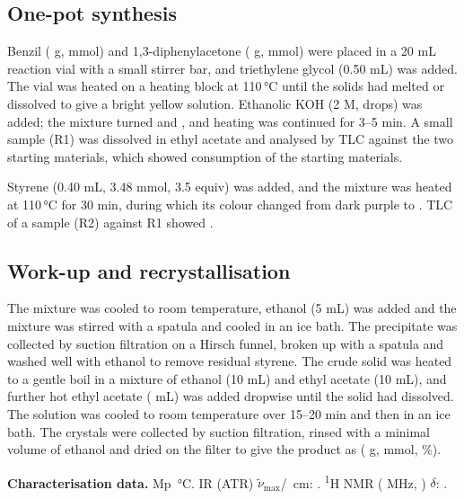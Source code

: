 \documentclass[11pt,a4paper]{article}
\begin{document}
\subsection{One-pot synthesis}
Benzil ( g,  mmol) and 1,3-diphenylacetone ( g,  mmol) were placed in a 20 mL reaction vial with a small stirrer bar, and triethylene glycol (0.50 mL) was added. The vial was heated on a heating block at 110\,\si{\celsius} until the solids had melted or dissolved to give a bright yellow solution. Ethanolic KOH (2 M,  drops) was added; the mixture turned  and , and heating was continued for 3--5 min. A small sample (R1) was dissolved in ethyl acetate and analysed by TLC against the two starting materials, which showed  consumption of the starting materials.

Styrene (0.40 mL, 3.48 mmol, 3.5 equiv) was added, and the mixture was heated at 110\,\si{\celsius} for 30 min, during which its colour changed from dark purple to . TLC of a sample (R2) against R1 showed .

\subsection{Work-up and recrystallisation}
The mixture was cooled to room temperature, ethanol (5 mL) was added and the mixture was stirred with a spatula and cooled in an ice bath. The precipitate was collected by suction filtration on a Hirsch funnel, broken up with a spatula and washed well with ethanol to remove residual styrene. The crude solid was heated to a gentle boil in a mixture of ethanol (10 mL) and ethyl acetate (10 mL), and further hot ethyl acetate ( mL) was added dropwise until the solid had dissolved. The solution was cooled to room temperature over 15--20 min and then in an ice bath. The crystals were collected by suction filtration, rinsed with a minimal volume of ethanol and dried on the filter to give the product as  ( g,  mmol, \%).

\noindent\textbf{Characterisation data.} Mp \,\si{\celsius}. IR (ATR) $\tilde{\nu}_\text{max}$/\si{\per\centi\metre}: . \textsuperscript{1}H NMR ( MHz, ) $\delta$: .
\end{document}
